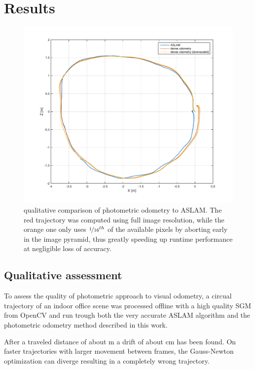 \chapter{Results}
\label{sec:results}



\begin{figure}
    \centering
    \includegraphics[width=\textwidth]{images/traj_aslam_downscaled.pdf}
    \caption{qualitative comparison of photometric odometry to ASLAM. The red
    trajectory was computed using full image resolution, while the orange one
    only uses $\nicefrac{1}{16}^{th}$ of the available pixels by aborting early in
the image pyramid, thus greatly speeding up runtime performance at negligible
loss of accuracy.}
    \label{fig:trajectory}
\end{figure}

\section{Qualitative assessment}
\label{sec:results_qualitative}

To assess the quality of photometric approach to visual odometry, a circual
trajectory of an indoor office scene was processed offline with a high quality
SGM from OpenCV and run trough both the very accurate ASLAM algorithm
\cite{leutenegger2013keyframe} and the photometric odometry method described in
this work.

After a traveled distance of about \unit[12]{m} a drift of about \unit[20]{cm}
has been found. On faster trajectories with larger movement between frames, the
Gauss-Newton optimization can diverge resulting in a completely wrong
trajectory.

